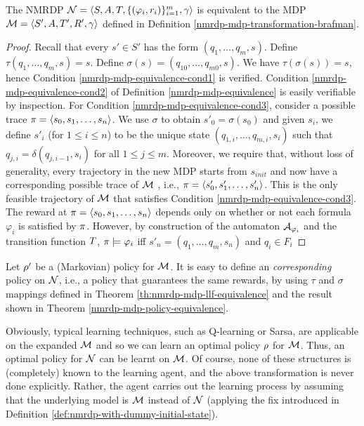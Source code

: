 \begin{theorem}\label{th:nmrdp-mdp-llf-equivalence}
	The NMRDP $\mathcal{N}= \langle S, A, T, \{(\varphi_i,r_i)\}_{i=1}^{m}, \gamma \rangle$ is equivalent to the  MDP $\mathcal{M}= \langle S',A,T',R', \gamma \rangle$ defined in Definition \ref{nmrdp-mdp-transformation-brafman}.
\end{theorem}
\begin{proof}
	Recall that every $s' \in S'$ has the form $(q_1 ,\dots, q_m , s)$.
	Define $\tau(q_1 ,\dots, q_m, s) = s$. Define $\sigma(s) = (q_{10} ,\dots, q_{m0}, s)$.
	We have $\tau(\sigma(s)) = s$, hence Condition \ref{nmrdp-mdp-equivalence-cond1} is verified. Condition \ref{nmrdp-mdp-equivalence-cond2} of Definition \ref{nmrdp-mdp-equivalence} is easily verifiable by inspection. For Condition \ref{nmrdp-mdp-equivalence-cond3}, consider a possible trace
	$\pi = \langle s_0, s_1, \dots, s_n \rangle$. We use $\sigma$ to obtain $s'_0 = \sigma(s_0)$
	and given $s_i$, we define $s'_i$ (for $1 \le i \le n$) to be the unique
	state $(q_{1,i} ,\dots, q_{m,i} , s_i)$ such that $q_{j,i} = \delta(q_{j,i-1}, s_i )$ for all
	$1 \le j \le m$. Moreover, we require that, without loss of generality, every trajectory in the new MDP starts from $s_{init}$ and  now have a corresponding possible trace of
	$\mathcal{M}$ , i.e., $\pi = \langle s'_0, s'_1, \dots, s'_n \rangle$. This is the only feasible trajectory of $\mathcal{M}$ that satisfies Condition \ref{nmrdp-mdp-equivalence-cond3}. The reward at
	$\pi = \langle s_0, s_1, \dots, s_n \rangle$ depends only on whether or not
	each formula $\varphi_i$ is satisfied by $\pi$. However, by construction
	of the automaton $\mathcal{A}_{\varphi_i}$ and the transition function $T$, $\pi \models \varphi_i$
	iff $s'_{n} = (q_1 ,\dots, q_m, s_n)$ and $q_i \in F_i$
\end{proof}


Let $\rho'$ be a (Markovian) policy for $\mathcal{M}$. It is easy to define an \emph{corresponding} policy on $\mathcal{N}$, i.e., a policy that guarantees the same rewards, by using $\tau$ and $\sigma$ mappings defined in Theorem \ref{th:nmrdp-mdp-llf-equivalence} and the result shown in Theorem \ref{nmrdp-mdp-policy-equivalence}.

Obviously, typical learning techniques, such as Q-learning
or Sarsa,  are applicable on the expanded
$\mathcal{M}$ and
so we can learn an optimal policy $\rho$ for $\mathcal{M}$. 
Thus, an optimal policy for $\mathcal{N}$ can be learnt on $\mathcal{M}$. 
Of course, none of these structures is (completely) 
known to the learning agent, and the above transformation is never done explicitly. Rather, the agent carries out the learning process
by assuming that the underlying model is $\mathcal{M}$ instead of $\mathcal{N}$ (applying the fix introduced in Definition \ref{def:nmrdp-with-dummy-initial-state}).


